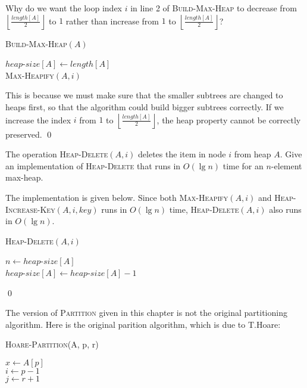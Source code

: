 
Why do we want the loop index $i$ in line 2 of \textsc{Build-Max-Heap} to decrease from $\left\lfloor \frac{length[A]}{2}\right\rfloor$ to $1$ rather than increase from $1$
to $\left\lfloor \frac{length[A]}{2}\right\rfloor$?

\begin{algorithm}[H]
\caption{\textsc{Build-Max-Heap}$(A)$}
$heap$-$size[A]\leftarrow length[A]$\\
 {
  \textsc{Max-Heapify}$(A, i)$
}
\end{algorithm}

\answer

This is because we must make sure that the smaller subtrees are changed to heaps first, so that the algorithm could build bigger subtrees correctly. If we increase the index $i$ from $1$ to
$\left\lfloor\frac{length[A]}{2}\right\rfloor$, the heap property cannot be correctly preserved.
\qed

The operation \textsc{Heap-Delete}$(A, i)$ deletes the item in node $i$ from heap $A$. Give an implementation of \textsc{Heap-Delete} that runs in $O(\lg n)$ time for an $n$-element
max-heap.

\answer

The implementation is given below. Since both \textsc{Max-Heapify}$(A, i)$ and \textsc{Heap-Increase-Key}$(A, i, key)$ runs in $O(\lg n)$ time, \textsc{Heap-Delete}$(A, i)$ also runs in $O(\lg n)$.

\begin{algorithm}[H]
\caption{\textsc{Heap-Delete}$(A, i)$}
$n \leftarrow heap$-$size[A]$\\
$heap$-$size[A] \leftarrow heap$-$size[A] - 1$\\
\end{algorithm}
\qed

The version of \textsc{Partition} given in this chapter is not the original partitioning algorithm. Here is the original parition algorithm, which is due to T.Hoare:

\begin{algorithm}[H]
\caption{\textsc{Hoare-Partition}(A, p, r)}
$x \leftarrow A[p]$\\
$i \leftarrow p - 1$\\
$j \leftarrow r + 1$\\
\end{algorithm}

